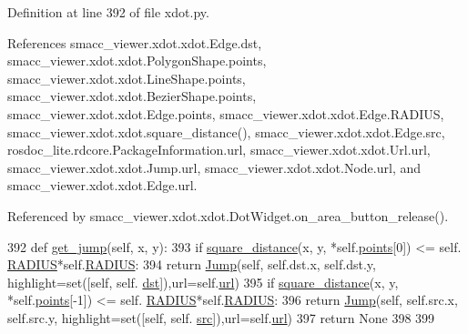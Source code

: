 Definition at line 392 of file xdot.\+py.



References smacc\+\_\+viewer.\+xdot.\+xdot.\+Edge.\+dst, smacc\+\_\+viewer.\+xdot.\+xdot.\+Polygon\+Shape.\+points, smacc\+\_\+viewer.\+xdot.\+xdot.\+Line\+Shape.\+points, smacc\+\_\+viewer.\+xdot.\+xdot.\+Bezier\+Shape.\+points, smacc\+\_\+viewer.\+xdot.\+xdot.\+Edge.\+points, smacc\+\_\+viewer.\+xdot.\+xdot.\+Edge.\+R\+A\+D\+I\+US, smacc\+\_\+viewer.\+xdot.\+xdot.\+square\+\_\+distance(), smacc\+\_\+viewer.\+xdot.\+xdot.\+Edge.\+src, rosdoc\+\_\+lite.\+rdcore.\+Package\+Information.\+url, smacc\+\_\+viewer.\+xdot.\+xdot.\+Url.\+url, smacc\+\_\+viewer.\+xdot.\+xdot.\+Jump.\+url, smacc\+\_\+viewer.\+xdot.\+xdot.\+Node.\+url, and smacc\+\_\+viewer.\+xdot.\+xdot.\+Edge.\+url.



Referenced by smacc\+\_\+viewer.\+xdot.\+xdot.\+Dot\+Widget.\+on\+\_\+area\+\_\+button\+\_\+release().


\begin{DoxyCode}
392     \textcolor{keyword}{def }\hyperlink{classsmacc__viewer_1_1xdot_1_1xdot_1_1Edge_a5c2391bfa8c8a6674b542131e47d1541}{get\_jump}(self, x, y):
393         \textcolor{keywordflow}{if} \hyperlink{namespacesmacc__viewer_1_1xdot_1_1xdot_abad117a3bd6d23954bbe1b261b595bfd}{square\_distance}(x, y, *self.\hyperlink{classsmacc__viewer_1_1xdot_1_1xdot_1_1Edge_ad3f042ee88c18f56adff36941ae9be3d}{points}[0]) <= self.
      \hyperlink{classsmacc__viewer_1_1xdot_1_1xdot_1_1Edge_a13af40bbc8e6a64e08c4d3a76afde6ec}{RADIUS}*self.\hyperlink{classsmacc__viewer_1_1xdot_1_1xdot_1_1Edge_a13af40bbc8e6a64e08c4d3a76afde6ec}{RADIUS}:
394             \textcolor{keywordflow}{return} \hyperlink{classsmacc__viewer_1_1xdot_1_1xdot_1_1Jump}{Jump}(self, self.dst.x, self.dst.y, highlight=set([self, self.
      \hyperlink{classsmacc__viewer_1_1xdot_1_1xdot_1_1Edge_a06202fe28435076ee948cae331614c6f}{dst}]),url=self.\hyperlink{classsmacc__viewer_1_1xdot_1_1xdot_1_1Edge_aa940458bc40062bd2e9857bc02102171}{url})
395         \textcolor{keywordflow}{if} \hyperlink{namespacesmacc__viewer_1_1xdot_1_1xdot_abad117a3bd6d23954bbe1b261b595bfd}{square\_distance}(x, y, *self.\hyperlink{classsmacc__viewer_1_1xdot_1_1xdot_1_1Edge_ad3f042ee88c18f56adff36941ae9be3d}{points}[-1]) <= self.
      \hyperlink{classsmacc__viewer_1_1xdot_1_1xdot_1_1Edge_a13af40bbc8e6a64e08c4d3a76afde6ec}{RADIUS}*self.\hyperlink{classsmacc__viewer_1_1xdot_1_1xdot_1_1Edge_a13af40bbc8e6a64e08c4d3a76afde6ec}{RADIUS}:
396             \textcolor{keywordflow}{return} \hyperlink{classsmacc__viewer_1_1xdot_1_1xdot_1_1Jump}{Jump}(self, self.src.x, self.src.y, highlight=set([self, self.
      \hyperlink{classsmacc__viewer_1_1xdot_1_1xdot_1_1Edge_ae8c708b03328bc06b00d2cc30626e61c}{src}]),url=self.\hyperlink{classsmacc__viewer_1_1xdot_1_1xdot_1_1Edge_aa940458bc40062bd2e9857bc02102171}{url})
397         \textcolor{keywordflow}{return} \textcolor{keywordtype}{None}
398 
399 
\end{DoxyCode}


